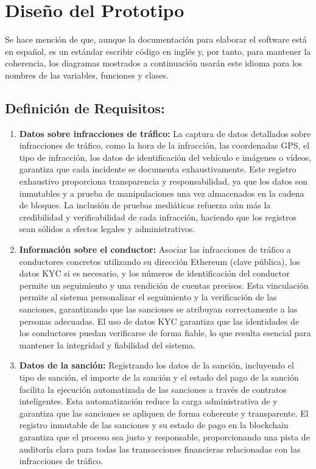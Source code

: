 \section{Diseño del Prototipo }
Se hace mención de que, aunque la documentación para elaborar el software está en español, es un estándar escribir código en inglés y, por tanto, para mantener la coherencia, los diagramas mostrados a continuación usarán este idioma para los nombres de las variables, funciones y clases.
\subsection{Definición de Requisitos:  }
    
\begin{enumerate}
    \item \textbf{Datos sobre infracciones de tráfico:} La captura de datos detallados sobre infracciones de tráfico, como la hora de la infracción, las coordenadas GPS, el tipo de infracción, los datos de identificación del vehículo e imágenes o vídeos, garantiza que cada incidente se documenta exhaustivamente. Este registro exhaustivo proporciona transparencia y responsabilidad, ya que los datos son inmutables y a prueba de manipulaciones una vez almacenados en la cadena de bloques. La inclusión de pruebas mediáticas refuerza aún más la credibilidad y verificabilidad de cada infracción, haciendo que los registros sean sólidos a efectos legales y administrativos. 
    \item \textbf{Información sobre el conductor:} Asociar las infracciones de tráfico a conductores concretos utilizando su dirección Ethereum (clave pública), los datos KYC si es necesario, y los números de identificación del conductor permite un seguimiento y una rendición de cuentas precisos. Esta vinculación permite al sistema personalizar el seguimiento y la verificación de las sanciones, garantizando que las sanciones se atribuyan correctamente a las personas adecuadas. El uso de datos KYC garantiza que las identidades de los conductores puedan verificarse de forma fiable, lo que resulta esencial para mantener la integridad y fiabilidad del sistema.
    \item \textbf{Datos de la sanción: }  Registrando los datos de la sanción, incluyendo el tipo de sanción, el importe de la sanción y el estado del pago de la sanción facilita la ejecución automatizada de las sanciones a través de contratos inteligentes. Esta automatización reduce la carga administrativa de y garantiza que las sanciones se apliquen de forma coherente y transparente. El registro inmutable de las sanciones y su estado de pago en la blockchain garantiza que el proceso sea justo y responsable, proporcionando una pista de auditoría clara para todas las transacciones financieras relacionadas con las infracciones de tráfico.

\end{enumerate}
